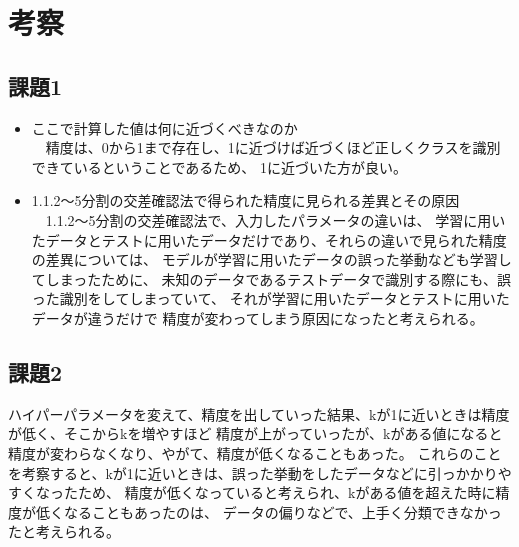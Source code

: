 \section{考察}
\subsection{課題1}
\begin{itemize}
  \item ここで計算した値は何に近づくべきなのか\\
  　精度は、0から1まで存在し、1に近づけば近づくほど正しくクラスを識別できているということであるため、
  1に近づいた方が良い。
  \item 1.1.2～5分割の交差確認法で得られた精度に見られる差異とその原因\\  
  　1.1.2～5分割の交差確認法で、入力したパラメータの違いは、
  学習に用いたデータとテストに用いたデータだけであり、それらの違いで見られた精度の差異については、
  モデルが学習に用いたデータの誤った挙動なども学習してしまったために、
  未知のデータであるテストデータで識別する際にも、誤った識別をしてしまっていて、
  それが学習に用いたデータとテストに用いたデータが違うだけで
  精度が変わってしまう原因になったと考えられる。
\end{itemize}

\subsection{課題2}
ハイパーパラメータを変えて、精度を出していった結果、kが1に近いときは精度が低く、そこからkを増やすほど
精度が上がっていったが、kがある値になると精度が変わらなくなり、やがて、精度が低くなることもあった。
これらのことを考察すると、kが1に近いときは、誤った挙動をしたデータなどに引っかかりやすくなったため、
精度が低くなっていると考えられ、kがある値を超えた時に精度が低くなることもあったのは、
データの偏りなどで、上手く分類できなかったと考えられる。